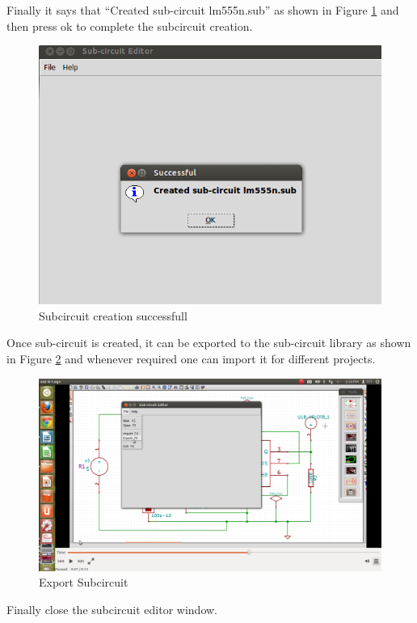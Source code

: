 Finally it says that “Created sub-circuit lm555n.sub”  as shown in Figure \ref{done} and then press ok to complete the subcircuit creation. 

\begin{figure}[h]%
\begin{center}
\includegraphics[width=1\linewidth]{figures/subcircuit-created.png}%
\caption{Subcircuit creation successfull}
\label{done}
\end{center}
\end{figure}

Once sub-circuit is created, it can be exported to the sub-circuit library as shown in Figure \ref{exp} and whenever required one can import it for different projects.

\begin{figure}[h]%
\begin{center}
\includegraphics[width=1\linewidth]{figures/export-subcircuit.png}%
\caption{Export Subcircuit}
\label{exp}
\end{center}
\end{figure}

Finally close the subcircuit editor window.










